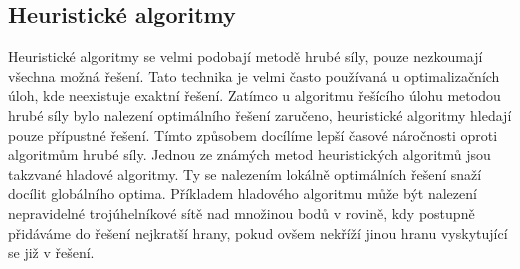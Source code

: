 \subsection{Heuristické algoritmy}
	Heuristické algoritmy se velmi podobají metodě hrubé síly, pouze nezkoumají všechna možná řešení. Tato technika je velmi často používaná u optimalizačních úloh, kde neexistuje exaktní řešení. Zatímco u algoritmu řešícího úlohu metodou hrubé síly bylo nalezení optimálního řešení zaručeno, heuristické algoritmy hledají pouze přípustné řešení. Tímto způsobem docílíme lepší časové náročnosti oproti algoritmům hrubé síly. Jednou ze známých metod heuristických algoritmů jsou takzvané hladové algoritmy. Ty se nalezením lokálně optimálních řešení snaží docílit globálního optima. Příkladem hladového algoritmu může být nalezení nepravidelné trojúhelníkové sítě nad množinou bodů v rovině, kdy postupně přidáváme do řešení nejkratší hrany, pokud ovšem nekříží jinou hranu vyskytující se již v řešení.
	
